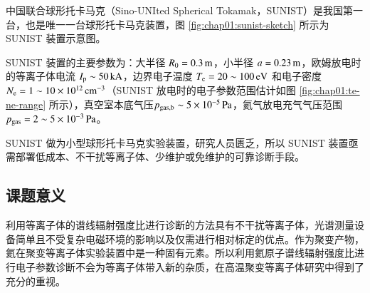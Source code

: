 中国联合球形托卡马克（Sino-UNIted Spherical Tokamak，SUNIST）是我国第一台，也是唯一一台球形托卡马克装置\cite{Heyexi2002:SUNIST}，图 \ref{fig:chap01:sunist-sketch} 所示为 SUNIST 装置示意图。

SUNIST 装置的主要参数为：大半径 $R_0=0.3\,{\rm m}$，小半径 $a=0.23\,{\rm m}$，欧姆放电时的等离子体电流 $I_{\rm p}\sim50\,{\rm kA}$，边界电子温度 $T_{\rm e}=20\sim100\,{\rm eV}$ 和电子密度 $N_{\rm e}=1\sim10\times10^{12}\,{\rm cm}^{-3}$\cite{WangWH2005:PPCF:Edge}（SUNIST 放电时的电子参数范围估计如图 \ref{fig:chap01:te-ne-range} 所示），真空室本底气压$p_{\rm gas,b}\sim5\times10^{-5}\,{\rm Pa}$，氦气放电充气气压范围 $p_{\rm gas}=2\sim5\times10^{-3}\,{\rm Pa}$。

SUNIST 做为小型球形托卡马克实验装置，研究人员匮乏，所以 SUNIST 装置亟需部署低成本、不干扰等离子体、少维护或免维护的可靠诊断手段。

%
%
%

\subsection{课题意义}
\label{sec:ketiyiyi}

利用等离子体的谱线辐射强度比进行诊断的方法具有不干扰等离子体，光谱测量设备简单且不受复杂电磁环境的影响以及仅需进行相对标定的优点。作为聚变产物，氦在聚变等离子体实验装置中是一种固有元素。所以利用氦原子谱线辐射强度比进行电子参数诊断不会为等离子体带入新的杂质，在高温聚变等离子体研究中得到了充分的重视。

